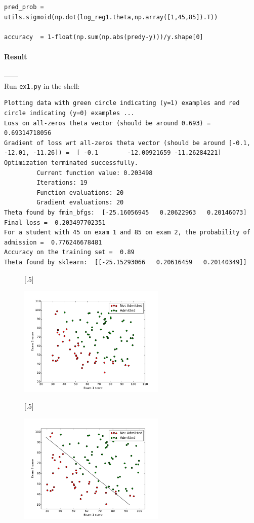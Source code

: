 \documentclass{article}
\begin{document}
\begin{tiny}
\begin{lstlisting}
pred_prob = utils.sigmoid(np.dot(log_reg1.theta,np.array([1,45,85]).T))

accuracy  = 1-float(np.sum(np.abs(predy-y)))/y.shape[0]
\end{lstlisting}
\end{tiny}

\paragraph{Result\\}
------\\
Run \verb|ex1.py| in the shell:
\begin{tiny}
\begin{lstlisting}
Plotting data with green circle indicating (y=1) examples and red circle indicating (y=0) examples ...
Loss on all-zeros theta vector (should be around 0.693) =  0.69314718056
Gradient of loss wrt all-zeros theta vector (should be around [-0.1, -12.01, -11.26]) =  [ -0.1        -12.00921659 -11.26284221]
Optimization terminated successfully.
         Current function value: 0.203498
         Iterations: 19
         Function evaluations: 20
         Gradient evaluations: 20
Theta found by fmin_bfgs:  [-25.16056945   0.20622963   0.20146073]
Final loss =  0.203497702351
For a student with 45 on exam 1 and 85 on exam 2, the probability of admission =  0.776246678481
Accuracy on the training set =  0.89
Theta found by sklearn:  [[-25.15293066   0.20616459   0.20140349]]
\end{lstlisting}
\end{tiny} 
\begin{figure}[H][.5\linewidth]{

	\includegraphics[width=7cm]{part1/fig1.pdf}

	}[.5\linewidth]{

	\includegraphics[width=7cm]{part1/fig2.pdf}

	}\caption{}
\end{figure}
\end{document}
